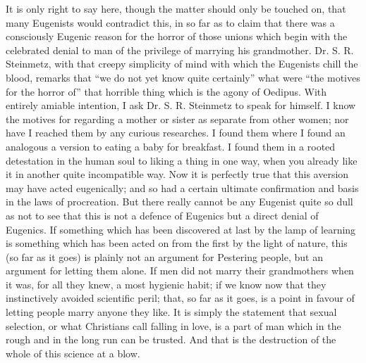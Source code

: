 \documentclass{book}
\begin{document}
It is only right to say here, though the matter should only be touched on, that many Eugenists would contradict this, in so far as to claim that there was a consciously Eugenic reason for the horror of those unions which begin with the celebrated denial to man of the privilege of marrying his grandmother. Dr. S. R. Steinmetz, with that creepy simplicity of mind with which the Eugenists chill the blood, remarks that “we do not yet know quite certainly” what were “the motives for the horror of” that horrible thing which is the agony of Oedipus. With entirely amiable intention, I ask Dr. S. R. Steinmetz to speak for himself. I know the motives for regarding a mother or sister as separate from other women; nor have I reached them by any curious researches. I found them where I found an analogous a version to eating a baby for breakfast. I found them in a rooted detestation in the human soul to liking a thing in one way, when you already like it in another quite incompatible way. Now it is perfectly true that this aversion may have acted eugenically; and so had a certain ultimate confirmation and basis in the laws of procreation. But there really cannot be any Eugenist quite so dull as not to see that this is not a defence of Eugenics but a direct denial of Eugenics. If something which has been discovered at last by the lamp of learning is something which has been acted on from the first by the light of nature, this (so far as it goes) is plainly not an argument for Pestering people, but an argument for letting them alone. If men did not marry their grandmothers when it was, for all they knew, a most hygienic habit; if we know now that they instinctively avoided scientific peril; that, so far as it goes, is a point in favour of letting people marry anyone they like. It is simply the statement that sexual selection, or what Christians call falling in love, is a part of man which in the rough and in the long run can be trusted. And that is the destruction of the whole of this science at a blow.
\end{document}
